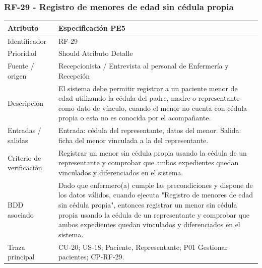 \documentclass[11pt,a4paper]{article}
\begin{document}
	\subsubsection{RF-29 - Registro de menores de edad sin cédula propia}
	\begin{tabularx}{\textwidth}{p{3.2cm}Y}
		\toprule
		\textbf{Atributo} & \textbf{Especificación PE5}\\\midrule
		Identificador & RF-29\\
		Prioridad & Should Atributo Detalle\\
		Fuente / origen & Recepcionista / Entrevista al personal de Enfermería y Recepción\\
		Descripción & El sistema debe permitir registrar a un paciente menor de edad utilizando la cédula del padre, madre o representante como dato de vínculo, cuando el menor no cuenta con cédula propia o esta no es conocida por el acompañante.\\
		Entradas / salidas & Entrada: cédula del representante, datos del menor. Salida: ficha del menor vinculada a la del representante.\\
		Criterio de verificación & Registrar un menor sin cédula propia usando la cédula de un representante y comprobar que ambos expedientes quedan vinculados y diferenciados en el sistema.\\
		BDD asociado & Dado que enfermero(a) cumple las precondiciones y dispone de los datos válidos, cuando ejecuta "Registro de menores de edad sin cédula propia", entonces registrar un menor sin cédula propia usando la cédula de un representante y comprobar que ambos expedientes quedan vinculados y diferenciados en el sistema.\\
		Traza principal & CU-20; US-18; Paciente, Representante; P01 Gestionar pacientes; CP-RF-29.\\
		\bottomrule
	\end{tabularx}
\end{document}
